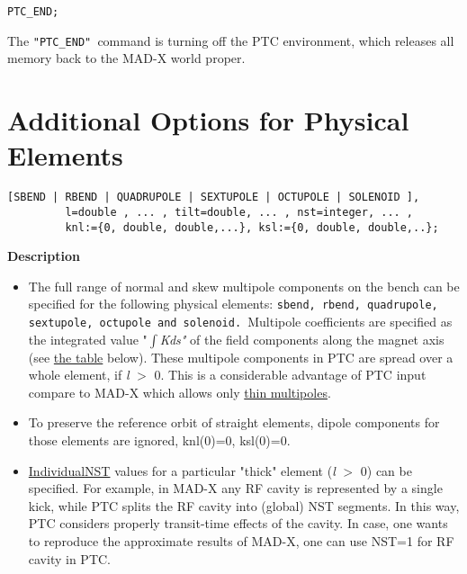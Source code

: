 \begin{verbatim}
PTC_END;
\end{verbatim}

The \texttt{"PTC\_END" }command  is turning off the PTC environment,
which releases all memory back to the MAD-X world proper.


\section{Additional Options for Physical Elements}

\begin{verbatim}
[SBEND | RBEND | QUADRUPOLE | SEXTUPOLE | OCTUPOLE | SOLENOID ],
         l=double , ... , tilt=double, ... , nst=integer, ... ,
         knl:={0, double, double,...}, ksl:={0, double, double,..}; 
\end{verbatim}


{\bf Description} \\
\begin{itemize}
   \item The full range of  normal and skew multipole components on the
     bench can be  specified for the following physical elements:
     \texttt{sbend, rbend, quadrupole, sextupole,  octupole and
       solenoid. }Multipole coefficients are specified as the integrated
     value "$\int$\textit{Kds"}  of the field components along the
     magnet axis (see \hyperlink{Multipoles_on_Bench_(PTC_only)}{the
       table} below). These multipole components in PTC are spread over
     a whole element, if \textit{l }$>$ 0. This is a considerable
     advantage of PTC input compare  to MAD-X  which allows only
     \href{../Introduction/multipole.html}{ thin multipoles}. 

   \item  To preserve the reference orbit of straight elements, dipole
     components  for those elements are ignored, knl(0)=0, ksl(0)=0.
      
   \item  \href{individual}{Individual}\hyperlink{NST}{NST} values for
     a  particular "thick" element (\textit{l }$>$ 0) can be
     specified. For example,  in MAD-X any RF cavity is represented
     by a single kick, while  PTC splits the RF cavity into (global)
     NST segments. In this  way, PTC considers properly transit-time
     effects of the cavity.  In case, one wants to reproduce the
     approximate results of  MAD-X, one can use NST=1 for RF cavity
     in PTC. 
\end{itemize}

